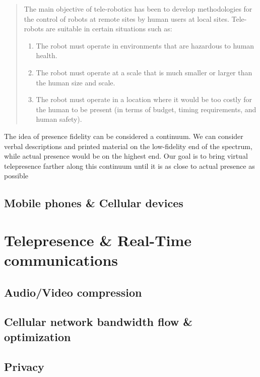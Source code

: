 \documentclass[a4paper,12pt]{report}
\begin{document}
\begin{quote}

The main objective of tele-robotics has been to develop methodologies for the control of robots at remote sites by human users at local sites. Tele-robots are suitable in certain situations such as:
\begin{enumerate}
\item The robot must operate in environments that are hazardous to human health.
\item The robot must operate at a scale that is much smaller or larger than the human size and scale.
\item The robot must operate in a location where it would be too costly for the human to be present (in terms of budget, timing requirements, and human safety).
\end{enumerate}
	\begin{flushright}
		\cite{726589}
	\end{flushright}
\end{quote}

The idea of presence fidelity can be considered a continuum. We can consider verbal descriptions and printed material on the low-fidelity end of the spectrum, while actual presence would be on the highest end. Our goal is to bring virtual telepresence farther along this continuum until it is as close to actual presence as possible \cite{726589}

\subsection{Mobile phones \& Cellular devices}
\cite{4469080}
\cite{6001904}
\cite{6007847}
\section{Telepresence \& Real-Time communications}
\subsection{Audio/Video compression}
\cite{4297087}
\cite{4801602}
\cite{5054795}
\subsection{Cellular network bandwidth flow \& optimization}
\cite{5710522}
\cite{1300874}
\cite{1376696}
\subsection{Privacy}
\cite{4698190}
\cite{4471983}
\cite{6270872}
\cite{1032602}
\end{document}
